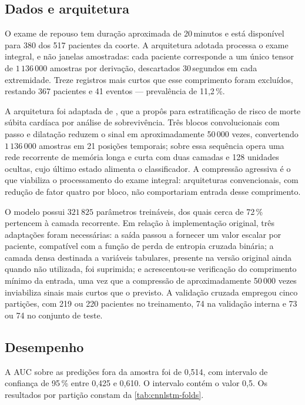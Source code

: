 \subsection{Dados e arquitetura}
\label{subsec:cnnlstm-dados}

O exame de repouso tem duração aproximada de 20\,minutos e está disponível
para 380 dos 517 pacientes da coorte. A arquitetura adotada processa o exame
integral, e não janelas amostradas: cada paciente corresponde a um único
tensor de $1\,136\,000$ amostras por derivação, descartados 30\,segundos em
cada extremidade. Treze registros mais curtos que esse comprimento foram
excluídos, restando 367 pacientes e 41 eventos --- prevalência de 11,2\,\%.

A arquitetura foi adaptada de , que a propôs para
estratificação de risco de morte súbita cardíaca por análise de
sobrevivência. Três blocos convolucionais com passo e dilatação reduzem o sinal em
aproximadamente 50\,000 vezes, convertendo $1\,136\,000$ amostras em 21
posições temporais; sobre essa sequência opera uma rede recorrente de memória
longa e curta com duas camadas e 128 unidades ocultas, cujo último estado
alimenta o classificador. A compressão agressiva é o que viabiliza o
processamento do exame integral: arquiteturas convencionais, com redução de
fator quatro por bloco, não comportariam entrada desse comprimento.

O modelo possui $321\,825$ parâmetros treináveis, dos quais cerca de 72\,\%
pertencem à camada recorrente. Em relação à implementação original, três
adaptações foram necessárias: a saída passou a fornecer um valor escalar por
paciente, compatível com a função de perda de entropia cruzada binária; a
camada densa destinada a variáveis tabulares, presente na versão original
ainda quando não utilizada, foi suprimida; e acrescentou-se verificação do
comprimento mínimo da entrada, uma vez que a compressão de aproximadamente
50\,000 vezes inviabiliza sinais mais curtos que o previsto. A validação cruzada empregou cinco partições,
com 219 ou 220 pacientes no treinamento, 74 na validação interna e 73 ou 74
no conjunto de teste.

\subsection{Desempenho}
\label{subsec:cnnlstm-desempenho}

A \gls{AUC} sobre as predições fora da amostra foi de 0,514, com intervalo de
confiança de 95\,\% entre 0,425 e 0,610. O intervalo contém o valor 0,5. Os
resultados por partição constam da \autoref{tab:cnnlstm-folds}.

